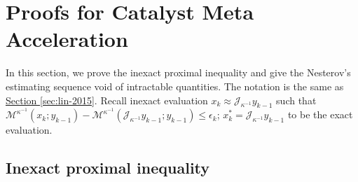 \documentclass[12pt]{article}
\begin{document}
        
\section{Proofs for Catalyst Meta Acceleration}
    In this section, we prove the inexact proximal inequality and give the Nesterov's estimating sequence void of intractable quantities. 
    The notation is the same as
    \hyperref[sec:lin-2015]{Section \ref*{sec:lin-2015}}. 
    Recall inexact evaluation $x_k \approx \mathcal J_{\kappa^{-1}}y_{k - 1}$ such that $\mathcal M^{\kappa^{-1}}(x_k; y_{k - 1}) - \mathcal M^{\kappa^{-1}}(\mathcal J_{\kappa^{-1}}y_{k - 1}; y_{k - 1}) \le \epsilon_k$; $x_k^* = \mathcal J_{\kappa^{-1}}y_{k - 1}$ to be the exact evaluation. 
    
    \subsection{Inexact proximal inequality}
\end{document}
